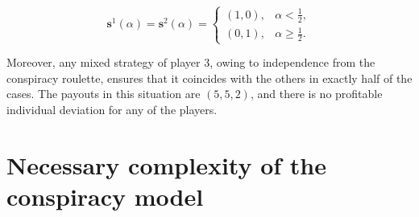 \begin{equation*}
	\mathbf{s}^1(\alpha) = \mathbf{s}^2(\alpha) = \begin{cases}
		(1, 0), & \alpha < \frac{1}{2},\\
		(0, 1), & \alpha \ge \frac{1}{2}.
	\end{cases}
\end{equation*}

Moreover, any mixed strategy of player 3, owing to independence from the conspiracy roulette, ensures that it coincides with the others in exactly half of the cases. The payouts in this situation are $(5,5,2)$, and there is no profitable individual deviation for any of the players. %

\section{Necessary complexity of the conspiracy model}\label{sec:ch1/sec5}


